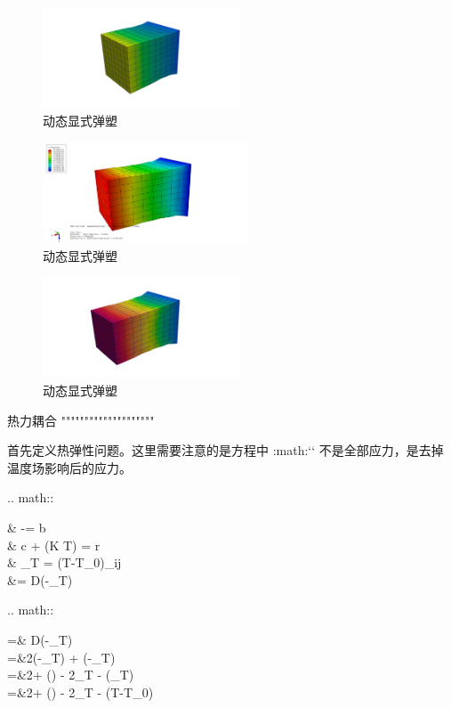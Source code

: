 \begin{figure}[!htbp]
  \centering
  \includegraphics[height=3cm]{fig/4/4.1.5/9-1.png}
  \caption{动态显式弹塑}
  \label{fig:4.1.4:4}
\end{figure}

\begin{figure}[!htbp]
  \centering
  \includegraphics[height=3cm]{fig/4/4.1.5/10.png}
  \caption{动态显式弹塑}
  \label{fig:4.1.4:4}
\end{figure}

\begin{figure}[!htbp]
  \centering
  \includegraphics[height=3cm]{fig/4/4.1.5/10-1.png}
  \caption{动态显式弹塑}
  \label{fig:4.1.4:4}
\end{figure}

\iffalse


热力耦合
""""""""""""""""""""

首先定义热弹性问题。这里需要注意的是方程中 :math:`\mathbf\sigma` 不是全部应力，是去掉温度场影响后的应力。

.. math::
   
  & -\nabla\cdot\mathbf \sigma = \mathbf b \\
  & \rho c + \nabla\cdot \left(\mathbf K \nabla T\right)  = r\\
  & \varepsilon_T = \alpha(T-T_0)\delta_{ij} \\
  &\mathbf\sigma = \mathbf D(\mathbf\varepsilon-\mathbf\varepsilon_T)

.. math::
   
  \mathbf\sigma =& \mathbf D(\mathbf\varepsilon-\mathbf\varepsilon_T)\\
  =&2\mu(\mathbf\varepsilon-\mathbf\varepsilon_T) + \lambda{}(\mathbf \varepsilon-\mathbf\varepsilon_T)\\
  =&2\mu\mathbf\varepsilon + \lambda{}(\mathbf \varepsilon) - 2\mu\mathbf\varepsilon_T - \lambda{}(\mathbf\varepsilon_T)\\
  =&2\mu\mathbf\varepsilon + \lambda{}(\mathbf \varepsilon) - 2\mu\mathbf\varepsilon_T - \alpha (T-T_0)

